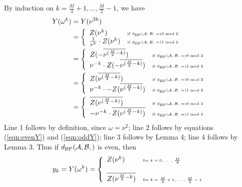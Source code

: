 By induction on $k=\frac{M}{4}+1,\dots,\frac{M}{2}-1$, we have
\begin{align}
Y(\omega^k)&= Y(\nu^{2k})  \nonumber \\
&= \left\{ \begin{array}{ll}
Z(\nu^{k}) &\mbox{\tiny if
$d_{\text{BP}}(\mathcal A,\mathcal B,\,=) 0 \bmod 2$}\\
\frac{1}{\nu^{k}} \cdot Z(\nu^{k})
&\mbox{\tiny if
$d_{\text{BP}}(\mathcal A,\mathcal B,\,=) 1 \bmod 2$}\\
\end{array} \right. \nonumber\\
&= \left\{ \begin{array}{ll}
Z(- \overline{\nu^{(\frac{M}{2}-k)}}) &\mbox{\tiny if
$d_{\text{BP}}(\mathcal A,\mathcal B,\,=) 0 \bmod 2$}\\
\nu^{-k} \cdot
Z(-\overline{\nu^{(\frac{M}{2}-k)}})
&\mbox{\tiny if
$d_{\text{BP}}(\mathcal A,\mathcal B,\,=) 1 \bmod 2$}\\
\end{array} \right. \nonumber\\
&= \left\{ \begin{array}{ll}
Z(\overline{\nu^{(\frac{M}{2}-k)}}) &\mbox{\tiny if
$d_{\text{BP}}(\mathcal A,\mathcal B,\,=) 0 \bmod 2$}\\
\nu^{-k} \cdot
-Z(\overline{\nu^{(\frac{M}{2}-k)}})
&\mbox{\tiny if
$d_{\text{BP}}(\mathcal A,\mathcal B,\,=) 1 \bmod 2$}\\
\end{array} \right.  \nonumber\\
&= \left\{ \begin{array}{ll}
\overline{Z(\nu^{(\frac{M}{2}-k)})} &\mbox{\tiny if
$d_{\text{BP}}(\mathcal A,\mathcal B,\,=) 0 \bmod 2$}\\
-\nu^{-k} \cdot
\overline{Z(\nu^{(\frac{M}{2}-k)})}
&\mbox{\tiny if
$d_{\text{BP}}(\mathcal A,\mathcal B,\,=) 1 \bmod 2$}\\
\end{array} \right.  \nonumber\\
\end{align}
Line 1 follows by definition, since $\omega=\nu^2$;
line 2 follows by equations (\ref{eqn:evenY}) and
(\ref{eqn:oddY});
line 3 follows by Lemma 4;
line 4 follows by Lemma 3.
Thus if $\dBP{\strA,\strB}$ is even, then
\begin{align}
\label{eqn:trickyRootsOfUnity1}
y_k = Y(\omega^k) = \left\{
\begin{array}{ll}
Z(\nu^k) &\mbox{\tiny for $k=0,\dots,\frac{M}{4}$}\\
\quad & \quad\\
\overline{Z(\nu^{\frac{M}{2}-k})} &\mbox{\tiny for $k=\frac{M}{4}+1,\dots,\frac{M}{2}-1$.}\\
\end{array} \right.
\end{align}
